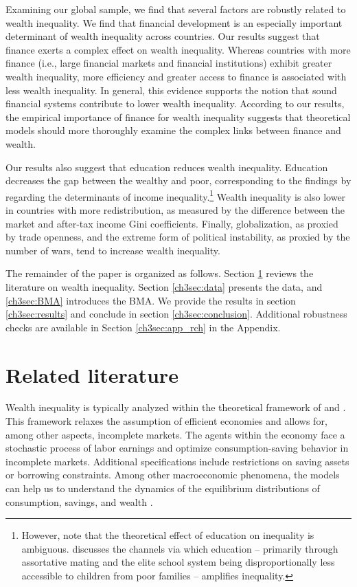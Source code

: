 \begin{refsection}
Examining our global sample, we find that several factors are robustly related to wealth inequality. We find that financial development is an especially important determinant of wealth inequality across countries. Our results suggest that finance exerts a complex effect on wealth inequality. Whereas countries with more finance (i.e., large financial markets and financial institutions) exhibit greater wealth inequality, more efficiency and greater access to finance is associated with less wealth inequality. In general, this evidence supports the notion that sound financial systems contribute to lower wealth inequality. According to our results, the empirical importance of finance for wealth inequality suggests that theoretical models should more thoroughly examine the complex links between finance and wealth.

Our results also suggest that education reduces wealth inequality. Education decreases the gap between the wealthy and poor, corresponding to the findings by \textcite{dabla2015causes} regarding the determinants of income inequality.\footnote{However, note that the theoretical effect of education on inequality is ambiguous. \textcite{scheidel} discusses the channels via which education -- primarily through assortative mating and the elite school system being disproportionally less accessible to children from poor families -- amplifies inequality.} Wealth inequality is also lower in countries with more redistribution, as measured by the difference between the market and after-tax income Gini coefficients. Finally, globalization, as proxied by trade openness, and the extreme form of political instability, as proxied by the number of wars, tend to increase wealth inequality. 

The remainder of the paper is organized as follows. Section \ref{ch3sec:literature} reviews the literature on wealth inequality. Section \ref{ch3sec:data} presents the data, and \ref{ch3sec:BMA} introduces the \ac{BMA}. We provide the results in section \ref{ch3sec:results} and conclude in section \ref{ch3sec:conclusion}. Additional robustness checks are available in Section \ref{ch3sec:app_rch} in the Appendix.
%
%
%
%
%
\section{Related literature}\label{ch3sec:literature}
Wealth inequality is typically analyzed within the theoretical framework of \textcite{bewley1977permanent} and \textcite{Ayiagari1994}. This framework relaxes the assumption of efficient economies and allows for, among other aspects, incomplete markets. The agents within the economy face a stochastic process of labor earnings and optimize consumption-saving behavior in incomplete markets. Additional specifications include restrictions on saving assets or borrowing constraints. Among other macroeconomic phenomena, the models can help us to understand the dynamics of the equilibrium distributions of consumption, savings, and wealth \parencite{BENHABIB2015489}.


\end{refsection}
